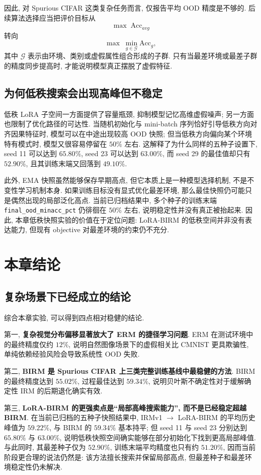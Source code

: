 \documentclass[a4paper,punct=banjiao,twoside]{ctexrep}
\theoremstyle{plain}
\theoremstyle{definition}
\theoremstyle{remark}
\begin{document}
因此, 对 Spurious CIFAR 这类复杂任务而言, 仅报告平均 OOD 精度是不够的. 后续算法选择应当把评价目标从
\[
\max \; \mathrm{Acc}_{avg}
\]
转向
\[
\max \; \min_{g \in \mathcal{G}} \mathrm{Acc}_{g},
\]
其中 $\mathcal{G}$ 表示由环境、类别或虚假属性组合形成的子群. 只有当最差环境或最差子群的精度同步提高时, 才能说明模型真正摆脱了虚假特征.

\subsection{为何低秩搜索会出现高峰但不稳定}

低秩 LoRA 子空间一方面提供了容量瓶颈, 抑制模型记忆高维虚假噪声; 另一方面也限制了优化路径的可达性. 当随机初始化与 mini-batch 序列恰好引导低秩方向对齐因果特征时, 模型可以在中途出现较高 OOD 快照; 但当低秩方向偏向某个环境特有模式时, 模型又很容易停留在 $50\%$ 左右. 这解释了为什么同样的五种子设置下, seed 11 可以达到 $65.80\%$, seed 23 可以达到 $63.00\%$, 而 seed 29 的最佳值却只有 $52.90\%$, 且其训练末端又回落到 $49.10\%$.

此外, EMA 快照虽然能够保存早期高点, 但它本质上是一种模型选择机制, 不是不变性学习机制本身. 如果训练目标没有显式优化最差环境, 那么最佳快照仍可能只是偶然出现的局部泛化高点. 当前已归档结果中, 多个种子的训练末端 \texttt{final\_ood\_minacc\_pct} 仍徘徊在 $50\%$ 左右, 说明稳定性并没有真正被抬起来. 因此, 本章低秩快照实验的价值在于定位问题: LoRA-BIRM 的低秩空间并非没有表达能力, 但现有 objective 对最差环境的约束仍不充分.

\section{本章结论}
\subsection{复杂场景下已经成立的结论}

综合本章实验, 可以得到四点相对稳健的结论.

第一, \textbf{复杂视觉分布偏移显著放大了 ERM 的捷径学习问题}. ERM 在测试环境中的最终精度仅约 $12\%$, 说明自然图像场景下的虚假相关比 CMNIST 更具欺骗性, 单纯依赖经验风险会导致系统性 OOD 失败.

第二, \textbf{BIRM 是 Spurious CIFAR 上三类完整训练基线中最稳健的方法}. BIRM 的最终精度达到 $55.02\%$, 过程最佳达到 $59.34\%$, 说明贝叶斯不确定性对于缓解确定性 IRM 的后期退化确实有效.

第三, \textbf{LoRA-BIRM 的更强卖点是“局部高峰搜索能力”, 而不是已经稳定超越 BIRM}. 在当前已归档的五种子快照结果中, IRMv1 $\rightarrow$ LoRA-BIRM 的平均历史峰值为 $59.22\%$, 与 BIRM 的 $59.34\%$ 基本持平; 但 seed 11 与 seed 23 分别达到 $65.80\%$ 与 $63.00\%$, 说明低秩快照空间确实能够在部分初始化下找到更高局部峰值. 与此同时, 其最差种子仅为 $52.90\%$, 训练末端平均精度也只有约 $51.20\%$, 因而当前阶段更合理的说法仍然是: 该方法擅长搜索并保留局部高点, 但最差种子和最差环境稳定性仍未解决.
\end{document}
